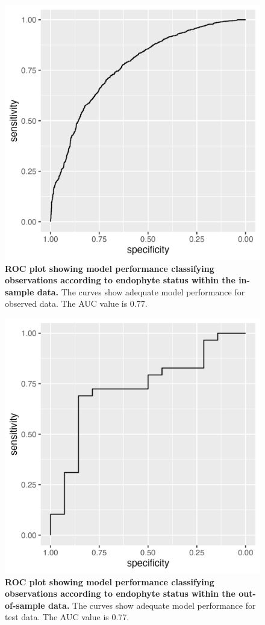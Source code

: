 \documentclass[11pt]{article}
\begin{document}
	
	\begin{figure}[H]
		\centering
		\includegraphics[width = .5\linewidth]{../Plots/ROC_training_plot.png}
		\caption{\textbf{ROC plot showing model performance classifying observations according to endophyte status within the in-sample data.} The curves show adequate model performance for observed data. The AUC value is 0.77.}
				\label{fig:ROCtraining}
	\end{figure}
	
		
	\begin{figure}[H]
		\centering
		\includegraphics[width = .5\linewidth]{../Plots/ROC_test_plot.png}
		\caption{\textbf{ROC plot showing model performance classifying observations according to endophyte status within the out-of-sample data.} The curves show adequate model performance for test data. The AUC value is 0.77.}
		\label{fig:ROCtest}
	\end{figure}
\end{document}
